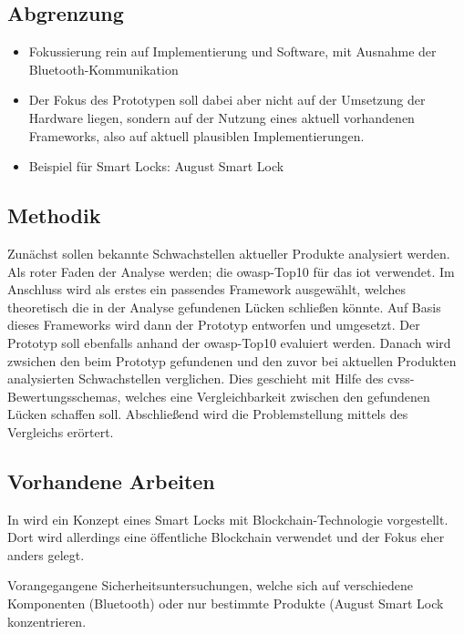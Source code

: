     
    \subsection{Abgrenzung}
    \label{sec:problem_limit}
    	\begin{itemize}
    		\item Fokussierung rein auf Implementierung und Software, mit Ausnahme der Bluetooth-Kommunikation
    		\item Der Fokus des Prototypen soll dabei aber nicht auf der Umsetzung der Hardware liegen, sondern auf der Nutzung eines aktuell vorhandenen Frameworks, also auf aktuell plausiblen Implementierungen. 
    		\item Beispiel für Smart Locks: August Smart Lock
    	\end{itemize}

    \subsection{Methodik}
    \label{sec:problem_methods}
        Zunächst sollen bekannte Schwachstellen aktueller Produkte analysiert werden.
        Als roter Faden der Analyse werden; die \gls{owasp}-Top10 für das \gls{iot}\cite{Miessler2015a} verwendet.
        Im Anschluss wird als erstes ein passendes Framework ausgewählt, welches theoretisch die in der Analyse gefundenen Lücken schließen könnte.
        Auf Basis dieses Frameworks wird dann der Prototyp entworfen und umgesetzt.
        Der Prototyp soll ebenfalls anhand der \gls{owasp}-Top10 evaluiert werden.
        Danach wird zwsichen den beim Prototyp gefundenen und den zuvor bei aktuellen Produkten analysierten Schwachstellen verglichen.
        Dies geschieht mit Hilfe des \gls{cvss}-Bewertungsschemas, welches eine Vergleichbarkeit zwischen den gefundenen Lücken schaffen soll.
        Abschließend wird die Problemstellung mittels des Vergleichs erörtert.
    
    \subsection{Vorhandene Arbeiten}
    \label{sec:problem_relatedWork}
        In \cite{Han2017} wird ein Konzept eines Smart Locks mit Blockchain-Technologie vorgestellt. 
        Dort wird allerdings eine öffentliche Blockchain verwendet und der Fokus eher anders gelegt. 
        
        Vorangegangene Sicherheitsuntersuchungen, welche sich auf verschiedene Komponenten (Bluetooth\cite{Rose2016}) oder nur bestimmte Produkte (August Smart Lock\cite{Fuller2017,Ho2016,Ye2017} konzentrieren.

